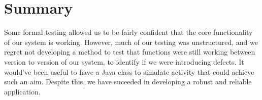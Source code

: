 \section{Summary}

Some formal testing allowed us to be fairly confident that the core functionality of our system is working. However, much of our testing was unstructured, and we regret not developing a method to test that functions were still working between version to version of our system, to identify if we were introducing defects. It would've been useful to have a Java class to simulate activity that could achieve such an aim. Despite this, we have suceeded in developing a robust and reliable application.  
